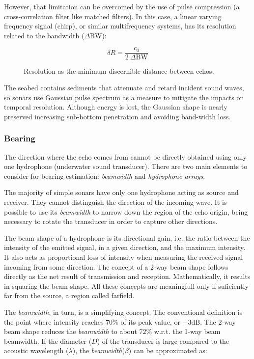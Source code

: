 However, that limitation can be overcomed by the use of pulse compression (a
cross-correlation filter like matched filters). In this case, a linear varying
frequency signal (chirp), or similar multifrequency systems, has its resolution
related to the bandwidth ($\Delta \text{BW}$):

\[ \delta R = \frac{c_0}{2~\Delta \text{BW}} \]

\begin{figure}
	\centering
	
	\caption{Resolution as the minimum discernible distance between echos.}
	\label{fig:chirpresolution}
\end{figure}

The seabed contains sediments that attenuate and retard incident sound waves, so
sonars use Gaussian pulse spectrum as a measure to mitigate the impacts on temporal
resolution. Although energy is lost, the Gaussian shape is nearly preserved
increasing sub-bottom penetration and avoiding band-width loss.

\subsubsection{Bearing}
\label{sss:bearing}

The direction where the echo comes from cannot be directly obtained using
only one hydrophone (underwater sound transducer). There are two main elements
to consider for bearing estimation: \textit{beamwidth} and \textit{hydrophone
arrays}.

The majority of simple sonars have only one hydrophone acting as source and
receiver. They cannot distinguish the direction of the incoming wave. It is
possible to use its \textit{beamwidth} to narrow down the region of the echo
origin, being necessary to rotate the transducer in order to capture
other directions.

The beam shape of a hydrophone is its directional gain, i.e. the ratio between
the intensity of the emitted signal, in a given direction, and the maximum
intensity. It also acts as proportional loss of intensity when measuring the
received signal incoming from some direction. The concept of a 2-way beam
shape follows directly as the net result of transmission and reception.
Mathematically, it results in squaring the beam shape. All these concepts are
meaningfull only if suficiently far from the source, a region called
farfield\cite{beamwidth}.

The \textit{beamwidth}, in turn, is a simplifying concept. The conventional
definition is the point where intensity reaches $70\%$ of its peak value,
or $-3\text{dB}$. The 2-way beam shape reduces the \textit{beamwidth} to about
$72\%$ w.r.t. the 1-way beam beamwidth. If the diameter ($D$) of the transducer
is large compared to the acoustic wavelength ($\lambda$), the
\textit{beamwidth}($\beta$) can be approximated as:

